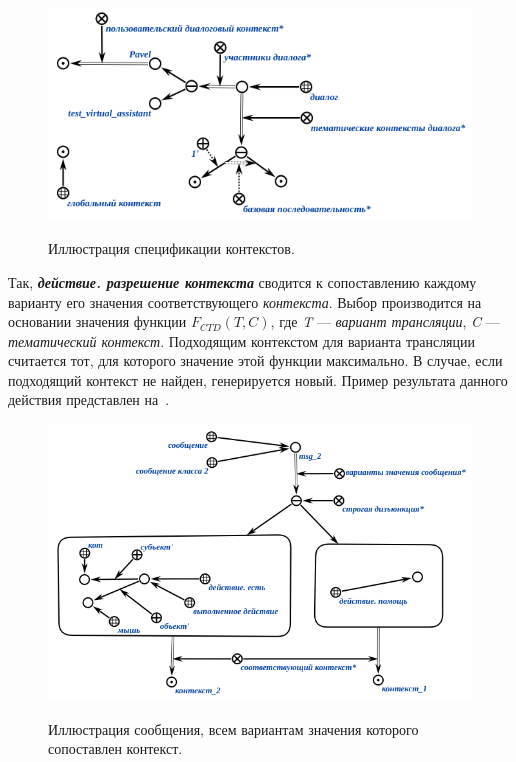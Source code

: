 \begin{figure}[H]
    \centering
    \caption{Иллюстрация спецификации контекстов.}
    \includegraphics[scale=0.8]{images/part4/chapter_nl_interfaces/user_context}
    \label{fig:user_context}
\end{figure}

Так, \textbf{\textit{действие. разрешение контекста}} сводится к сопоставлению каждому варианту его значения соответствующего \textit{контекста}.
Выбор производится на основании значения функции \textit{$F_{CTD}(T, C)$}, где \textit{T} --- \textit{вариант трансляции}, \textit{C} --- \textit{тематический контекст}.
Подходящим контекстом для варианта трансляции считается тот, для которого значение этой функции максимально.
В случае, если подходящий контекст не найден, генерируется новый.
Пример результата данного действия представлен на~\textit{}.

\begin{figure}[H]
    \centering
    \caption{Иллюстрация сообщения, всем вариантам значения которого сопоставлен контекст.}
    \includegraphics[scale=0.8]{images/part4/chapter_nl_interfaces/relevant_contexts}
    \label{fig:relevant_contexts}
\end{figure}

